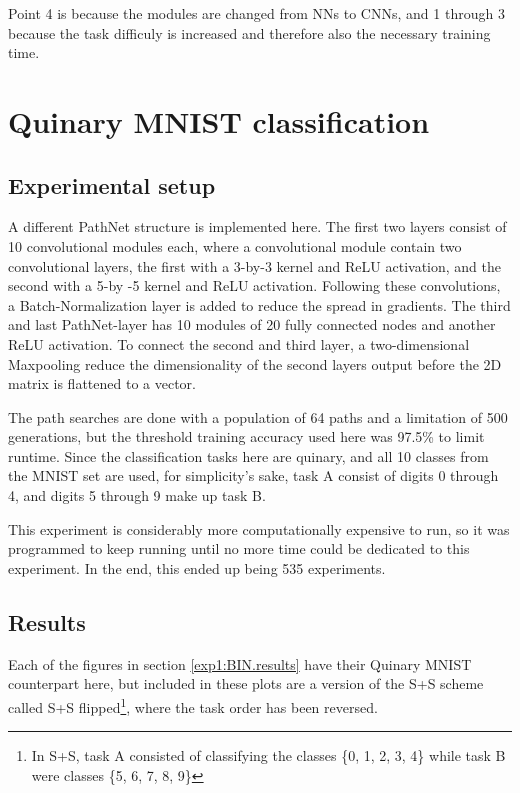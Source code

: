 Point 4 is because the modules are changed from NNs to CNNs, and 1 through 3 because the task difficuly is increased and therefore also the necessary training time. 

\section{Quinary MNIST classification}
\subsection{Experimental setup}
A different PathNet structure is implemented here. The first two layers consist of 10 convolutional modules each, where a convolutional module contain two convolutional layers, the first with a 3-by-3 kernel and ReLU activation, and the second with a 5-by -5 kernel and ReLU activation. Following these convolutions, a Batch-Normalization layer is added to reduce the spread in gradients. The third and last PathNet-layer has 10 modules of 20 fully connected nodes and another ReLU activation. To connect the second and third layer, a two-dimensional Maxpooling reduce the dimensionality of the second layers output before the 2D matrix is flattened to a vector.   

The path searches are done with a population of 64 paths and a limitation of 500 generations, but the threshold training accuracy used here was 97.5\% to limit runtime. Since the classification tasks here are quinary, and all 10 classes from the MNIST set are used, for simplicity's sake, task A consist of digits 0 through 4, and digits 5 through 9 make up task B. 

This experiment is considerably more computationally expensive to run, so it was programmed to keep running until no more time could be dedicated to this experiment. In the end, this ended up being 535 experiments. 

\subsection{Results}
\label{exp1:results.quinary}
Each of the figures in section \ref{exp1:BIN.results} have their Quinary MNIST counterpart here, but included in these plots are a version of the S+S scheme called S+S flipped\footnote{In S+S, task A consisted of classifying the classes \{0, 1, 2, 3, 4\} while task B were classes \{5, 6, 7, 8, 9\}}, where the task order has been reversed.

